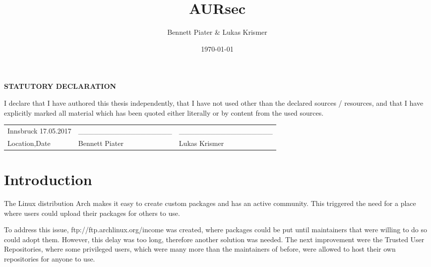 \documentclass{scrartcl}
\title{AURsec}
\author{Bennett Piater \& Lukas Krismer}
\date{\today}
\begin{document}
  \thispagestyle{empty}

  


  \vspace*{\fill}
  \begin{center} \textbf{\large{STATUTORY DECLARATION}} \end{center}
  I declare that I have authored this thesis independently, that I have not used other than the declared sources  /  resources,  and  that  I  have  explicitly  marked  all  material  which  has  been  quoted  either literally or by content from the used sources.

  \begin{center}
  \begin{table}[!htb]
  \begin{tabularx}{\textwidth}{lXX}
  Innsbruck 17.05.2017 & \_\_\_\_\_\_\_\_\_\_\_\_\_\_\_\_\_\_ & \_\_\_\_\_\_\_\_\_\_\_\_\_\_\_\_\_\_ \\
  Location,Date & Bennett Piater & Lukas Krismer \\

  \end{tabularx}
  \end{table}
  \end{center}
  \vspace*{\fill}
  \pagebreak


  \begin{abstract}
  \end{abstract}

  \tableofcontents
  \listoffigures
  \listoftables
  \pagebreak



  \section{Introduction}  %
  The Linux distribution Arch makes it easy to create custom packages and has an active community. This triggered the need for a place where users could upload their packages for others to use.

  To address this issue, ftp://ftp.archlinux.org/income was created, where packages could be put until maintainers that were willing to do so could adopt them. However, this delay was too long, therefore another solution was needed.
  The next improvement were the Trusted User Repositories, where some privileged users, which were many more than the maintainers of before, were allowed to host their own repositories for anyone to use.
\end{document}
